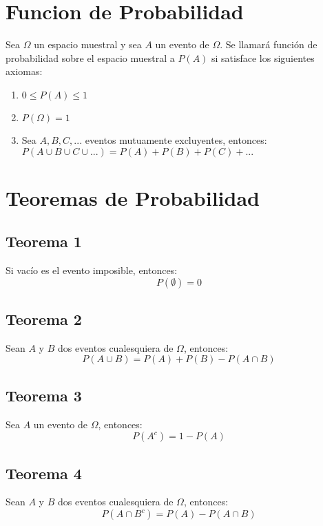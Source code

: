 \documentclass{templateNote}
\begin{document}
\newpage
\section{Funcion de Probabilidad}
\indent
Sea $\Omega$ un espacio muestral y sea $A$ un evento de $\Omega$. Se llamará función de
probabilidad sobre el espacio muestral a $P(A)$ si satisface los siguientes axiomas:
\begin{enumerate}
    \item $0 \leq P(A) \leq 1 $
    \item $P(\Omega) = 1 $
    \item Sea $A,B,C,...$ eventos mutuamente excluyentes, entonces: \newline
    $P(A \cup B \cup C \cup ...) = P(A) + P(B) + P(C) + ...$
\end{enumerate}

\section{Teoremas de Probabilidad}
\subsection{Teorema 1}
\indent
Si vacío es el evento imposible, entonces:
\begin{equation*}
    P(\emptyset) = 0
\end{equation*}

\subsection{Teorema 2}
\indent
Sean $A$ y $B$ dos eventos cualesquiera de $\Omega$, entonces:
\begin{equation*}
    P(A \cup B) = P(A) + P(B) - P(A \cap B)
\end{equation*}

\subsection{Teorema 3}
\indent
Sea $A$ un evento de $\Omega$, entonces:
\begin{equation*}
    P(A^c) = 1 - P(A)
\end{equation*}

\subsection{Teorema 4}
\indent
Sean $A$ y $B$ dos eventos cualesquiera de $\Omega$, entonces:
\begin{equation*}
    P(A \cap B^c) = P(A) - P(A \cap B)
\end{equation*}
\end{document}

